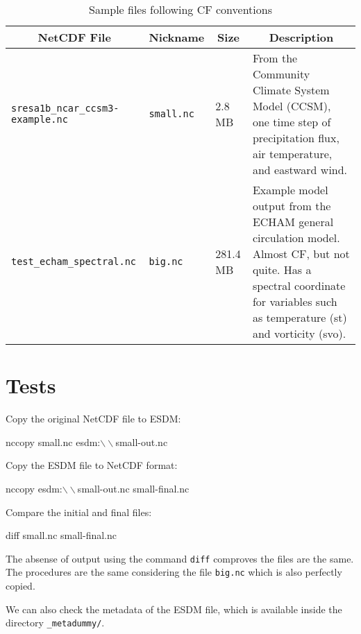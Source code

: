 \begin{table}[H]
\centering
\begin{tabular}{|l|l|l|m{4.2cm}|}
\hline
\multicolumn{1}{|c|}{NetCDF File}	& \multicolumn{1}{c|}{Nickname} & \multicolumn{1}{c|}{Size} & \multicolumn{1}{c|}{Description} \\ \hline \hline
\texttt{sresa1b\_ncar\_ccsm3-example.nc} & \texttt{small.nc} & 2.8 MB & From the Community Climate System Model (CCSM), one time step of precipitation flux, air temperature, and eastward wind. \\ \hline
\texttt{test\_echam\_spectral.nc} & \texttt{big.nc} & 281.4 MB & Example model output from the ECHAM general circulation model. Almost CF, but not quite. Has a spectral coordinate for variables such as temperature (st) and vorticity (svo). \\ \hline
\hline
\end{tabular}
\caption{\label{tab:netcdf} Sample files following CF conventions}
\end{table}

\section{Tests}

Copy the original NetCDF file to ESDM:

\begin{framed}
nccopy small.nc esdm:$\backslash\backslash$small-out.nc
\end{framed}

Copy the ESDM file to NetCDF format:

\begin{framed}
nccopy esdm:$\backslash\backslash$small-out.nc small-final.nc
\end{framed}

Compare the initial and final files:

\begin{framed}
diff small.nc small-final.nc
\end{framed}

The absense of output using the command \texttt{diff} comproves the files are the same. The procedures are the same considering the file \texttt{big.nc} which is also perfectly copied.

We can also check the metadata of the ESDM file, which is available inside the directory \texttt{\_metadummy/}.


